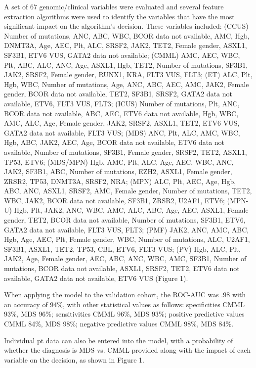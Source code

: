 A set of 67 genomic/clinical variables were evaluated and several feature extraction algorithms were used to identify the variables that have the most significant impact on the algorithm's decision. These variables included: (CCUS) Number of mutations, ANC, ABC, WBC, BCOR data not available, AMC, Hgb, DNMT3A, Age, AEC, Plt, ALC, SRSF2, JAK2, TET2, Female gender, ASXL1, SF3B1, ETV6 VUS, GATA2 data not available; (CMML) AMC, AEC, WBC, Plt, ABC, ALC, ANC, Age, ASXL1, Hgb, TET2, Number of mutations, SF3B1, JAK2, SRSF2, Female gender, RUNX1, KRA, FLT3 VUS, FLT3; (ET) ALC, Plt, Hgb, WBC, Number of mutations, Age, ANC, ABC, AEC, AMC, JAK2, Female gender, BCOR data not available, TET2, SF3B1, SRSF2, GATA2 data not available, ETV6, FLT3 VUS, FLT3; (ICUS) Number of mutations, Plt, ANC, BCOR data not available, ABC, AEC, ETV6 data not available, Hgb, WBC, AMC, ALC, Age, Female gender, JAK2, SRSF2, ASXL1, TET2, ETV6 VUS, GATA2 data not available, FLT3 VUS; (MDS) ANC, Plt, ALC, AMC, WBC, Hgb, ABC, JAK2, AEC, Age, BCOR data not available, ETV6 data not available, Number of mutations, SF3B1, Female gender, SRSF2, TET2, ASXL1, TP53, ETV6; (MDS/MPN) Hgb, AMC, Plt, ALC, Age, AEC, WBC, ANC, JAK2, SF3B1, ABC, Number of mutations, EZH2, ASXL1, Female gender, ZRSR2, TP53, DNMT3A, SRSF2, NRA; (MPN) ALC, Plt, AEC, Age, Hgb, ABC, ANC, ASXL1, SRSF2, AMC, Female gender, Number of mutations, TET2, WBC, JAK2, BCOR data not available, SF3B1, ZRSR2, U2AF1, ETV6; (MPN-U) Hgb, Plt, JAK2, ANC, WBC, AMC, ALC, ABC, Age, AEC, ASXL1, Female gender, TET2, BCOR data not available, Number of mutations, SF3B1, ETV6, GATA2 data not available, FLT3 VUS, FLT3; (PMF) JAK2, ANC, AMC, ABC, Hgb, Age, AEC, Plt, Female gender, WBC, Number of mutations, ALC, U2AF1, SF3B1, ASXL1, TET2, TP53, CBL, ETV6, FLT3 VUS; (PV) Hgb, ALC, Plt, JAK2, Age, Female gender, AEC, ABC, ANC, WBC, AMC, SF3B1, Number of mutations, BCOR data not available, ASXL1, SRSF2, TET2, ETV6 data not available, GATA2 data not available, ETV6 VUS (Figure 1).

When applying the model to the validation cohort, the ROC-AUC was .98 with an accuracy of 94\%, with other statistical values as follows: specificities CMML 93\%, MDS 96\%; sensitivities CMML 96\%, MDS 93\%; positive predictive values CMML 84\%, MDS 98\%; negative predictive values CMML 98\%, MDS 84\%.

Individual pt data can also be entered into the model, with a probability of whether the diagnosis is MDS vs. CMML provided along with the impact of each variable on the decision, as shown in Figure 1.

